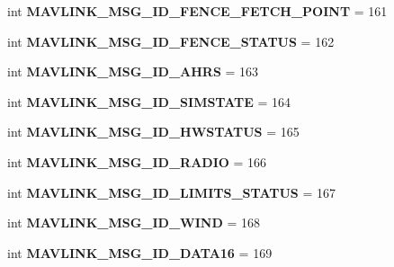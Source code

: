 \begin{DoxyCompactItemize}
int {\bfseries M\+A\+V\+L\+I\+N\+K\+\_\+\+M\+S\+G\+\_\+\+I\+D\+\_\+\+F\+E\+N\+C\+E\+\_\+\+F\+E\+T\+C\+H\+\_\+\+P\+O\+I\+NT} = 161
\item 
\mbox{\label{namespacepymavlink_1_1dialects_1_1v10_a3deb984bc717cb187f2e6ae288b2ed0f}} 
int {\bfseries M\+A\+V\+L\+I\+N\+K\+\_\+\+M\+S\+G\+\_\+\+I\+D\+\_\+\+F\+E\+N\+C\+E\+\_\+\+S\+T\+A\+T\+US} = 162
\item 
\mbox{\label{namespacepymavlink_1_1dialects_1_1v10_a0bdc2a105f983c42403f29e20231e71d}} 
int {\bfseries M\+A\+V\+L\+I\+N\+K\+\_\+\+M\+S\+G\+\_\+\+I\+D\+\_\+\+A\+H\+RS} = 163
\item 
\mbox{\label{namespacepymavlink_1_1dialects_1_1v10_a372f812c1753ed6e7ee852baa94965cc}} 
int {\bfseries M\+A\+V\+L\+I\+N\+K\+\_\+\+M\+S\+G\+\_\+\+I\+D\+\_\+\+S\+I\+M\+S\+T\+A\+TE} = 164
\item 
\mbox{\label{namespacepymavlink_1_1dialects_1_1v10_af9f4d8142f706f60f16020e67a0d95e0}} 
int {\bfseries M\+A\+V\+L\+I\+N\+K\+\_\+\+M\+S\+G\+\_\+\+I\+D\+\_\+\+H\+W\+S\+T\+A\+T\+US} = 165
\item 
\mbox{\label{namespacepymavlink_1_1dialects_1_1v10_a07bad3e98416a333af30d9023c1fd640}} 
int {\bfseries M\+A\+V\+L\+I\+N\+K\+\_\+\+M\+S\+G\+\_\+\+I\+D\+\_\+\+R\+A\+D\+IO} = 166
\item 
\mbox{\label{namespacepymavlink_1_1dialects_1_1v10_a76c93640f5632168b6e77c1599626cd2}} 
int {\bfseries M\+A\+V\+L\+I\+N\+K\+\_\+\+M\+S\+G\+\_\+\+I\+D\+\_\+\+L\+I\+M\+I\+T\+S\+\_\+\+S\+T\+A\+T\+US} = 167
\item 
\mbox{\label{namespacepymavlink_1_1dialects_1_1v10_aba255a7f461dee895895ab0ca8a16722}} 
int {\bfseries M\+A\+V\+L\+I\+N\+K\+\_\+\+M\+S\+G\+\_\+\+I\+D\+\_\+\+W\+I\+ND} = 168
\item 
\mbox{\label{namespacepymavlink_1_1dialects_1_1v10_a3fdf91ce35f212fdd25121d371317764}} 
int {\bfseries M\+A\+V\+L\+I\+N\+K\+\_\+\+M\+S\+G\+\_\+\+I\+D\+\_\+\+D\+A\+T\+A16} = 169

\end{DoxyCompactItemize}
